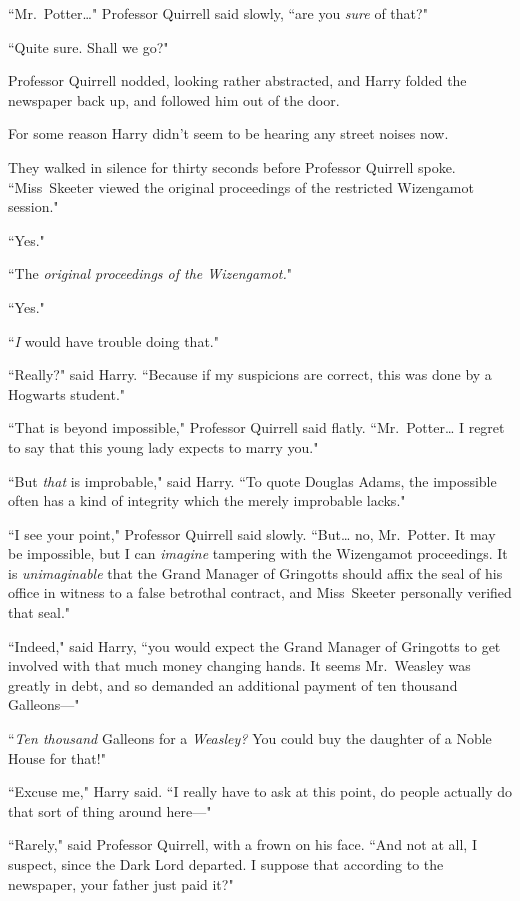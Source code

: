 ``Mr.~Potter{\ldots}" Professor Quirrell said slowly, ``are you \emph{sure} of that?"

``Quite sure. Shall we go?"

Professor Quirrell nodded, looking rather abstracted, and Harry folded the newspaper back up, and followed him out of the door.

For some reason Harry didn't seem to be hearing any street noises now.

They walked in silence for thirty seconds before Professor Quirrell spoke. ``Miss~Skeeter viewed the original proceedings of the restricted Wizengamot session."

``Yes."

``The \emph{original proceedings of the Wizengamot.}"

``Yes."

``\emph{I} would have trouble doing that."

``Really?" said Harry. ``Because if my suspicions are correct, this was done by a Hogwarts student."

``That is beyond impossible," Professor Quirrell said flatly. ``Mr.~Potter{\ldots} I regret to say that this young lady expects to marry you."

``But \emph{that} is improbable," said Harry. ``To quote Douglas Adams, the impossible often has a kind of integrity which the merely improbable lacks."

``I see your point," Professor Quirrell said slowly. ``But{\ldots} no, Mr.~Potter. It may be impossible, but I can \emph{imagine} tampering with the Wizengamot proceedings. It is \emph{unimaginable} that the Grand Manager of Gringotts should affix the seal of his office in witness to a false betrothal contract, and Miss~Skeeter personally verified that seal."

``Indeed," said Harry, ``you would expect the Grand Manager of Gringotts to get involved with that much money changing hands. It seems Mr.~Weasley was greatly in debt, and so demanded an additional payment of ten thousand Galleons—"

``\emph{Ten thousand} Galleons for a \emph{Weasley?} You could buy the daughter of a Noble House for that!"

``Excuse me," Harry said. ``I really have to ask at this point, do people actually do that sort of thing around here—"

``Rarely," said Professor Quirrell, with a frown on his face. ``And not at all, I suspect, since the Dark Lord departed. I suppose that according to the newspaper, your father just paid it?"

